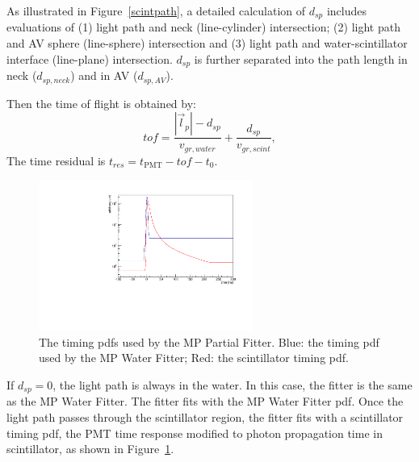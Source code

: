 As illustrated in Figure~\ref{scintpath}, a detailed calculation of $d_{sp}$ includes evaluations of (1) light path and neck (line-cylinder) intersection; (2) light path and AV sphere (line-sphere) intersection and (3) light path and water-scintillator interface (line-plane) intersection. $d_{sp}$ is further separated into the path length in neck ($d_{sp,neck}$) and in AV ($d_{sp,AV}$).

Then the time of flight is obtained by:
\begin{equation}
tof = \frac{|\vec{l}_p|-d_{sp}}{v_{gr,water}} +\frac{d_{sp}}{v_{gr,scint}},
\end{equation}
The time residual is $t_{res} = t_\mathrm{PMT}-tof-t_0$.

\begin{figure}[htbp]
	\centering	
	\includegraphics[width=7cm]{scintpdf.pdf}
	\caption{The timing pdfs used by the MP Partial Fitter. Blue: the timing pdf used by the MP Water Fitter; Red: the scintillator timing pdf.}
	\label{partialpdf}
\end{figure}

If $d_{sp}=0$, the light path is always in the water. In this case, the fitter is the same as the MP Water Fitter. The fitter fits with the MP Water Fitter pdf. Once the light path passes through the scintillator region, the fitter fits with a scintillator timing pdf, the PMT time response modified to photon propagation time in scintillator, as shown in Figure~\ref{partialpdf}.

